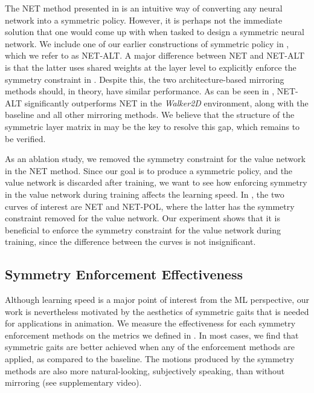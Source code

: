   The NET method presented in  is 
an intuitive way of converting any neural network into a symmetric policy.  
However, it is perhaps not the immediate solution that one would come up with when tasked to design a symmetric neural network.  
We include one of our earlier constructions of symmetric policy in , 
which we refer to as NET-ALT.  A major difference between NET and NET-ALT is that the latter uses 
shared weights at the layer level to explicitly enforce the symmetry constraint in .  
Despite this, the two architecture-based mirroring methods should, in theory, have similar performance.  
As can be seen in , NET-ALT significantly outperforms NET in the \textit{Walker2D} environment, 
along with the baseline and all other mirroring methods.  
We believe that the structure of the symmetric layer matrix in  
may be the key to resolve this gap, which remains to be verified.

  As an ablation study, we removed the symmetry constraint 
for the value network in the NET method.  Since our goal is to produce a symmetric policy, 
and the value network is discarded after training, we want to see how enforcing symmetry in the value network 
during training affects the learning speed.  In , the two curves of interest are 
NET and NET-POL, where the latter has the symmetry constraint removed for the value network.  
Our experiment shows that it is beneficial to enforce the symmetry constraint for the value network during training, 
since the difference between the curves is not insignificant.  

\subsection{Symmetry Enforcement Effectiveness}

Although learning speed is a major point of interest from the ML perspective, 
our work is nevertheless motivated by the aesthetics of symmetric gaits that is needed for applications in animation.  
We measure the effectiveness for each symmetry enforcement methods on the metrics we defined in .  
In most cases, we find that symmetric gaits are better achieved when any of the enforcement methods are applied, 
as compared to the baseline.  The motions produced by the symmetry methods are also more 
natural-looking, subjectively speaking, than without mirroring (see supplementary video). 

